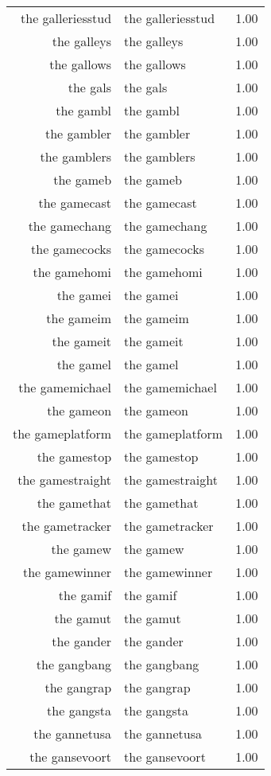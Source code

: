 \begin{table}[ht]
\begin{tabular}{rlr}
  the galleriesstud & the galleriesstud & 1.00 \\ 
  the galleys & the galleys & 1.00 \\ 
  the gallows & the gallows & 1.00 \\ 
  the gals & the gals & 1.00 \\ 
  the gambl & the gambl & 1.00 \\ 
  the gambler & the gambler & 1.00 \\ 
  the gamblers & the gamblers & 1.00 \\ 
  the gameb & the gameb & 1.00 \\ 
  the gamecast & the gamecast & 1.00 \\ 
  the gamechang & the gamechang & 1.00 \\ 
  the gamecocks & the gamecocks & 1.00 \\ 
  the gamehomi & the gamehomi & 1.00 \\ 
  the gamei & the gamei & 1.00 \\ 
  the gameim & the gameim & 1.00 \\ 
  the gameit & the gameit & 1.00 \\ 
  the gamel & the gamel & 1.00 \\ 
  the gamemichael & the gamemichael & 1.00 \\ 
  the gameon & the gameon & 1.00 \\ 
  the gameplatform & the gameplatform & 1.00 \\ 
  the gamestop & the gamestop & 1.00 \\ 
  the gamestraight & the gamestraight & 1.00 \\ 
  the gamethat & the gamethat & 1.00 \\ 
  the gametracker & the gametracker & 1.00 \\ 
  the gamew & the gamew & 1.00 \\ 
  the gamewinner & the gamewinner & 1.00 \\ 
  the gamif & the gamif & 1.00 \\ 
  the gamut & the gamut & 1.00 \\ 
  the gander & the gander & 1.00 \\ 
  the gangbang & the gangbang & 1.00 \\ 
  the gangrap & the gangrap & 1.00 \\ 
  the gangsta & the gangsta & 1.00 \\ 
  the gannetusa & the gannetusa & 1.00 \\ 
  the gansevoort & the gansevoort & 1.00 \\ 

\end{tabular}
\end{table}
